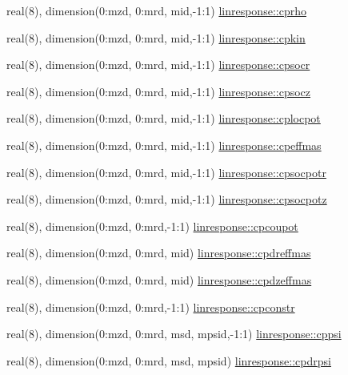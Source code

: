 \begin{DoxyCompactItemize}
\item 
real(8), dimension(0\+:mzd, 0\+:mrd, mid,-\/1\+:1) \hyperlink{namespacelinresponse_ae8d5663cab17941d63b83058fa05c0f5}{linresponse\+::cprho}
\item 
real(8), dimension(0\+:mzd, 0\+:mrd, mid,-\/1\+:1) \hyperlink{namespacelinresponse_a64503af5073d1f46b908f149a807e6cd}{linresponse\+::cpkin}
\item 
real(8), dimension(0\+:mzd, 0\+:mrd, mid,-\/1\+:1) \hyperlink{namespacelinresponse_a43aec530adfd4c583ce9d970182a0fb7}{linresponse\+::cpsocr}
\item 
real(8), dimension(0\+:mzd, 0\+:mrd, mid,-\/1\+:1) \hyperlink{namespacelinresponse_a8e6f56787bbe0fc2da109f6db06e85e5}{linresponse\+::cpsocz}
\item 
real(8), dimension(0\+:mzd, 0\+:mrd, mid,-\/1\+:1) \hyperlink{namespacelinresponse_ac16a6e91cc1e8f95c47946e97742b3ae}{linresponse\+::cplocpot}
\item 
real(8), dimension(0\+:mzd, 0\+:mrd, mid,-\/1\+:1) \hyperlink{namespacelinresponse_a4d310a63d9c52ff4529c55e317efce5d}{linresponse\+::cpeffmas}
\item 
real(8), dimension(0\+:mzd, 0\+:mrd, mid,-\/1\+:1) \hyperlink{namespacelinresponse_aadb1987010da49aa0411aa240720073b}{linresponse\+::cpsocpotr}
\item 
real(8), dimension(0\+:mzd, 0\+:mrd, mid,-\/1\+:1) \hyperlink{namespacelinresponse_a0eda5bcaba548efd96f5b4228a94476d}{linresponse\+::cpsocpotz}
\item 
real(8), dimension(0\+:mzd, 0\+:mrd,-\/1\+:1) \hyperlink{namespacelinresponse_a49ecc02a0ce115698ecdda83c4b57cb2}{linresponse\+::cpcoupot}
\item 
real(8), dimension(0\+:mzd, 0\+:mrd, mid) \hyperlink{namespacelinresponse_afde69c119f8f0479417ad9cc3b17ff52}{linresponse\+::cpdreffmas}
\item 
real(8), dimension(0\+:mzd, 0\+:mrd, mid) \hyperlink{namespacelinresponse_adf9a384f9c47067a0bf64bd061abe4f6}{linresponse\+::cpdzeffmas}
\item 
real(8), dimension(0\+:mzd, 0\+:mrd,-\/1\+:1) \hyperlink{namespacelinresponse_ac93c3179f7a68e6beb7ebb0850752b63}{linresponse\+::cpconstr}
\item 
real(8), dimension(0\+:mzd, 0\+:mrd, msd, mpsid,-\/1\+:1) \hyperlink{namespacelinresponse_a1b1d1e3dce337fd38d6e2c55f51ed589}{linresponse\+::cppsi}
\item 
real(8), dimension(0\+:mzd, 0\+:mrd, msd, mpsid) \hyperlink{namespacelinresponse_af6c0268944233db3ebabc44cfd9c3ea7}{linresponse\+::cpdrpsi}

\end{DoxyCompactItemize}
